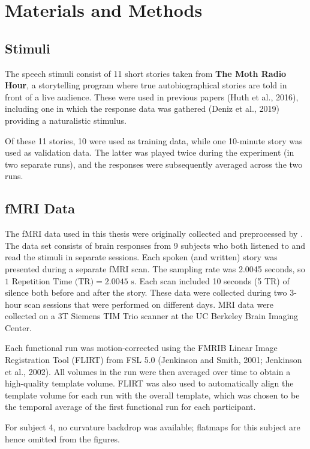 \documentclass[a4paper]{article}
\begin{document}
\section*{Materials and Methods} 

\subsection*{Stimuli} 
The speech stimuli consist of 11 short stories taken from \textbf{The Moth Radio Hour}, a storytelling program where true autobiographical stories are told in front of a live audience. These were used in previous papers (Huth et al., 2016), including one in which the response data was gathered (Deniz et al., 2019) providing a naturalistic stimulus. 

Of these 11 stories, 10 were used as training data, while one 10-minute story was used as validation data. The latter was played twice during the experiment (in two separate runs), and the responses were subsequently averaged across the two runs. 

\subsection*{fMRI Data}
The fMRI data used in this thesis were originally collected and preprocessed by \textcite{deniz_representation_2019}. The data set consists of brain responses from 9 subjects who both listened to and read the stimuli in separate sessions. Each spoken (and written) story was presented during a separate fMRI scan. The sampling rate was 2.0045 seconds, so $1 \text{ Repetition Time (TR)} = 2.0045 \text{ s}$. Each scan included 10 seconds (5 TR) of silence both before and after the story. These data were collected during two 3-hour scan sessions that were performed on different days. MRI data were collected on a 3T Siemens TIM Trio scanner at the UC Berkeley Brain Imaging Center.  

Each functional run was motion-corrected using the FMRIB Linear Image Registration Tool (FLIRT) from FSL 5.0 (Jenkinson and Smith, 2001; Jenkinson et al., 2002). All volumes in the run were then averaged over time to obtain a high-quality template volume. FLIRT was also used to automatically align the template volume for each run with the overall template, which was chosen to be the temporal average of the first functional run for each participant. 

For subject 4, no curvature backdrop was available; flatmaps for this subject are hence omitted from the figures.
\end{document}
